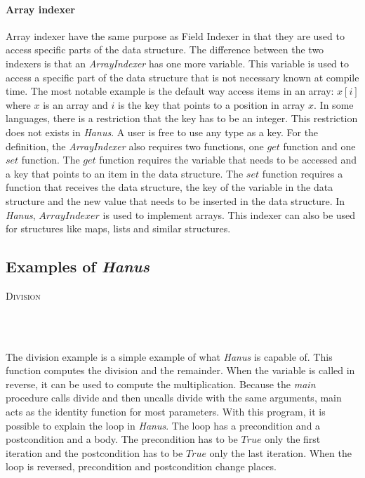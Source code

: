 \documentclass[12pt,a4paper]{article}
\newcommand{\code}[2]{
	\begin{center}
		\vspace{.5cm}
		\textsc{\small #1}\\
		\vspace{.5cm}
	\end{center}
	\begin{minipage}{.9\textwidth}
		\inputminted[frame=lines,framesep=1cm,baselinestretch=.8,linenos,fontsize=\footnotesize]
			{haskell}{code/#2.hs}
	\end{minipage}
}
\begin{document}
	\paragraph{Array indexer}	
	Array indexer have the same purpose as Field Indexer in that they are used to access specific parts of the data structure. The difference between the two indexers is that an \textit{ArrayIndexer} has one more variable. This variable is used to access a specific part of the data structure that is not necessary known at compile time. The most notable example is the default way access items in an array: $x[i]$ where $x$ is an array and $i$ is the key that points to a position in array $x$. In some languages, there is a restriction that the key has to be an integer. This restriction does not exists in \textit{Hanus}. A user is free to use any type as a key. For the definition, the \textit{ArrayIndexer} also requires two functions, one $get$ function and one $set$ function. The $get$ function requires the variable that needs to be accessed and a key that points to an item in the data structure. The $set$ function requires a function that receives the data structure, the key of the variable in the data structure and the new value that needs to be inserted in the data structure. In \textit{Hanus}, $ArrayIndexer$ is used to implement arrays. This indexer can also be used for structures like maps, lists and similar structures. 	
	
\subsection{Examples of \textit{Hanus}}	
	
\code{Division}{divide}	\\\\
The division example is a simple example of what \textit{Hanus} is capable of. This function computes the division and the remainder. When the variable is called in reverse, it can be used to compute the multiplication. Because the \textit{main} procedure calls divide and then uncalls divide with the same arguments, main acts as the identity function for most parameters. With this program, it is possible to explain the loop in \textit{Hanus}. The loop has a precondition and a postcondition and a body. The precondition has to be $True$ only the first iteration and the postcondition has to be $True$ only the last iteration. When the loop is reversed, precondition and postcondition change places. 
	
\end{document}
